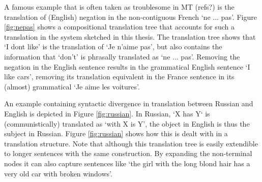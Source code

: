 \documentclass{report}
\theoremstyle{definition}
\theoremstyle{plain}
\begin{document}
A famous example that is often taken as troublesome in MT (refs?) is the translation of (English) negation in the non-contiguous French `ne ... pas'. Figure \ref{fig:nepas} shows a compositional translation tree that accounts for such a translation in the system sketched in this thesis. The translation tree shows that `I dont like' is the translation of `Je n'aime pas', but also contains the information that `don't' is phrasally translated as `ne ... pas'. Removing the negation in the English sentence results in the grammatical English sentence `I like cars', removing its translation equivalent in the France sentence in its (almost) grammatical `Je aime les voitures'. 

An example containing syntactic divergence in translation between Russian and English is depicted in Figure \ref{fig:russian}. In Russian, `X has Y` is (communistically) translated as `with X is Y', the object in English is thus the subject in Russian. Figure \ref{fig:russian} shows how this is dealt with in a translation structure. Note that although this translation tree is easily extendible to longer sentences with the same construction. By expanding the non-terminal nodes it can also capture sentences like `the girl with the long blond hair has a very old car with broken windows'.
\end{document}
